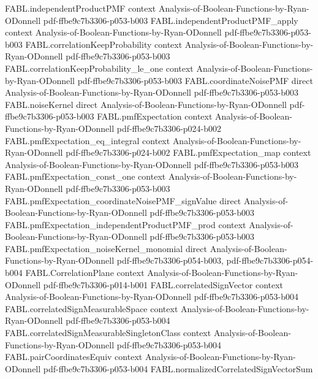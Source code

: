 \begin{theorem}
\proofstep
  {FABL.independentProductPMF}
  {context}
  {Analysis-of-Boolean-Functions-by-Ryan-ODonnell}
  {pdf-ffbe9c7b3306-p053-b003}
\proofstep
  {FABL.independentProductPMF_apply}
  {context}
  {Analysis-of-Boolean-Functions-by-Ryan-ODonnell}
  {pdf-ffbe9c7b3306-p053-b003}
\proofstep
  {FABL.correlationKeepProbability}
  {context}
  {Analysis-of-Boolean-Functions-by-Ryan-ODonnell}
  {pdf-ffbe9c7b3306-p053-b003}
\proofstep
  {FABL.correlationKeepProbability_le_one}
  {context}
  {Analysis-of-Boolean-Functions-by-Ryan-ODonnell}
  {pdf-ffbe9c7b3306-p053-b003}
\proofstep
  {FABL.coordinateNoisePMF}
  {direct}
  {Analysis-of-Boolean-Functions-by-Ryan-ODonnell}
  {pdf-ffbe9c7b3306-p053-b003}
\proofstep
  {FABL.noiseKernel}
  {direct}
  {Analysis-of-Boolean-Functions-by-Ryan-ODonnell}
  {pdf-ffbe9c7b3306-p053-b003}
\proofstep
  {FABL.pmfExpectation}
  {context}
  {Analysis-of-Boolean-Functions-by-Ryan-ODonnell}
  {pdf-ffbe9c7b3306-p024-b002}
\proofstep
  {FABL.pmfExpectation_eq_integral}
  {context}
  {Analysis-of-Boolean-Functions-by-Ryan-ODonnell}
  {pdf-ffbe9c7b3306-p024-b002}
\proofstep
  {FABL.pmfExpectation_map}
  {context}
  {Analysis-of-Boolean-Functions-by-Ryan-ODonnell}
  {pdf-ffbe9c7b3306-p053-b003}
\proofstep
  {FABL.pmfExpectation_const_one}
  {context}
  {Analysis-of-Boolean-Functions-by-Ryan-ODonnell}
  {pdf-ffbe9c7b3306-p053-b003}
\proofstep
  {FABL.pmfExpectation_coordinateNoisePMF_signValue}
  {direct}
  {Analysis-of-Boolean-Functions-by-Ryan-ODonnell}
  {pdf-ffbe9c7b3306-p053-b003}
\proofstep
  {FABL.pmfExpectation_independentProductPMF_prod}
  {context}
  {Analysis-of-Boolean-Functions-by-Ryan-ODonnell}
  {pdf-ffbe9c7b3306-p053-b003}
\proofstep
  {FABL.pmfExpectation_noiseKernel_monomial}
  {direct}
  {Analysis-of-Boolean-Functions-by-Ryan-ODonnell}
  {pdf-ffbe9c7b3306-p054-b003,
    pdf-ffbe9c7b3306-p054-b004}
\proofstep
  {FABL.CorrelationPlane}
  {context}
  {Analysis-of-Boolean-Functions-by-Ryan-ODonnell}
  {pdf-ffbe9c7b3306-p014-b001}
\proofstep
  {FABL.correlatedSignVector}
  {context}
  {Analysis-of-Boolean-Functions-by-Ryan-ODonnell}
  {pdf-ffbe9c7b3306-p053-b004}
\proofstep
  {FABL.correlatedSignMeasurableSpace}
  {context}
  {Analysis-of-Boolean-Functions-by-Ryan-ODonnell}
  {pdf-ffbe9c7b3306-p053-b004}
\proofstep
  {FABL.correlatedSignMeasurableSingletonClass}
  {context}
  {Analysis-of-Boolean-Functions-by-Ryan-ODonnell}
  {pdf-ffbe9c7b3306-p053-b004}
\proofstep
  {FABL.pairCoordinatesEquiv}
  {context}
  {Analysis-of-Boolean-Functions-by-Ryan-ODonnell}
  {pdf-ffbe9c7b3306-p053-b004}
\proofstep
  {FABL.normalizedCorrelatedSignVectorSum}

\end{theorem}
